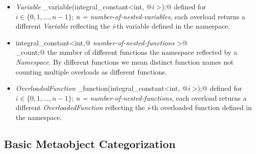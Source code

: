 \begin{itemize}
\item{{\em Variable} \verb@ith_variable(integral_constant<int, @{\em i}
\verb@>);@} defined for $i \in \{0, 1, \dots, n-1\}$; {\em n = number-of-nested-variables},
each overload returns a different {\em Variable} reflecting the {\em i}-th
variable defined in the namespace.

\item{\verb@typedef integral_constant<int,@ {\em number-of-nested-functions}
\verb@>@\\\verb@function_count;@} the number of different functions 
the namespace reflected by a {\em Namespace}. By different functions we mean
distinct function names not counting multiple overloads as different functions.

\item{{\em OverloadedFunction} \verb@ith_function(integral_constant<int, @{\em i}
\verb@>);@} defined for $i \in \{0, 1, \dots, n-1\}$; {\em n = number-of-nested-functions},
each overload returns a different {\em OverloadedFunction} reflecting the {\em i}-th
overloaded function defined in the namespace.

\end{itemize}

\subsection{Basic Metaobject Categorization}

